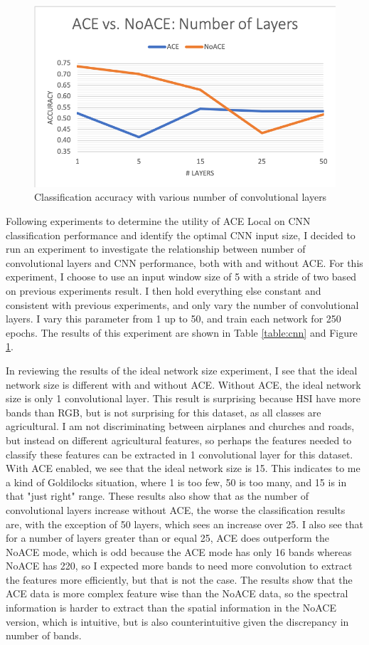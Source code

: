 \documentclass[12pt]{article}
\begin{document}
\begin{figure}[t]
	
	\centering
	\caption{Classification accuracy with various number of convolutional layers}
	\label{figure:num-layers}
	
	\includegraphics[width=0.5\linewidth]{num-layers.png}
	
	
	
\end{figure}

Following experiments to determine the utility of ACE Local on CNN classification performance and identify the optimal CNN input size, I decided to run an experiment to investigate the relationship between number of convolutional layers and CNN performance, both with and without ACE.
%
For this experiment, I choose to use an input window size of 5 with a stride of two based on previous experiments result.
%
I then hold everything else constant and consistent with previous experiments, and only vary the number of convolutional layers.
%
I vary this parameter from 1 up to 50, and train each network for 250 epochs.
%
The results of this experiment are shown in Table \ref{table:cnn} and Figure \ref{figure:num-layers}.

In reviewing the results of the ideal network size experiment, I see that the ideal network size is different with and without ACE.
%
Without ACE, the ideal network size is only 1 convolutional layer.
%
This result is surprising because HSI have more bands than RGB, but is not surprising for this dataset, as all classes are agricultural. 
%
I am not discriminating between airplanes and churches and roads, but instead on different agricultural features, so perhaps the features needed to classify these features can be extracted in 1 convolutional layer for this dataset.
%
With ACE enabled, we see that the ideal network size is 15. 
%
This indicates to me a kind of Goldilocks situation, where 1 is too few, 50 is too many, and 15 is in that "just right" range. 
%
These results also show that as the number of convolutional layers increase without ACE, the worse the classification results are, with the exception of 50 layers, which sees an increase over 25.
%
I also see that for a number of layers greater than or equal 25, ACE does outperform the NoACE mode, which is odd because the ACE mode has only 16 bands whereas NoACE has 220, so I expected more bands to need more convolution to extract the features more efficiently, but that is not the case.
%
The results show that the ACE data is more complex feature wise than the NoACE data, so the spectral information is harder to extract than the spatial information in the NoACE version, which is intuitive, but is also counterintuitive given the discrepancy in number of bands.
\end{document}
